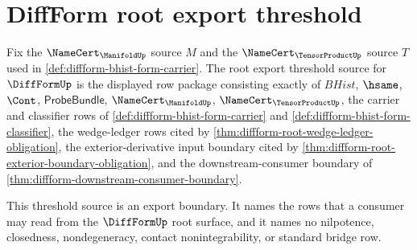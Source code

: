 \section{DiffForm root export threshold}
\label{sec:diffform-root-export-threshold}

\begin{definition}
\label{def:diffform-root-export-threshold-source}
Fix the $\NameCert_{\ManifoldUp}$ source $M$ and the
$\NameCert_{\TensorProductUp}$ source $T$ used in
\autoref{def:diffform-bhist-form-carrier}. The root export threshold source
for $\DiffFormUp$ is the displayed row package consisting exactly of
$BHist$, $\hsame$, $\Cont$, $\mathsf{ProbeBundle}$,
$\NameCert_{\ManifoldUp}$, $\NameCert_{\TensorProductUp}$, the carrier and
classifier rows of \autoref{def:diffform-bhist-form-carrier} and
\autoref{def:diffform-bhist-form-classifier}, the wedge-ledger rows cited by
\autoref{thm:diffform-root-wedge-ledger-obligation}, the exterior-derivative
input boundary cited by \autoref{thm:diffform-root-exterior-boundary-obligation},
and the downstream-consumer boundary of
\autoref{thm:diffform-downstream-consumer-boundary}.

This threshold source is an export boundary. It names the rows that a
consumer may read from the $\DiffFormUp$ root surface, and it names no
nilpotence, closedness, nondegeneracy, contact nonintegrability, or standard
bridge row.
\end{definition}

